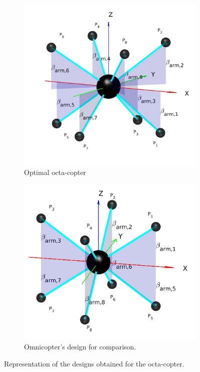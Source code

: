 \begin{figure}[!ht]
  \begin{subfigure}[b]{0.49\textwidth}
    \includegraphics[width=\linewidth]{images/Octacopter.jpg}
    \caption{Optimal octa-copter} \label{fig:Octacopter_resulta}
  \end{subfigure}
  \hspace*{\fill} %
  \begin{subfigure}[b]{0.49\textwidth}
    \includegraphics[width=\linewidth]{images/omnicopter.jpg}
    \caption{Omnicopter's design for comparison.} \label{fig:Octacopter_resultb}
  \end{subfigure}
  \caption{Representation of the designs obtained for the octa-copter.}
  \label{fig:Octacopter_result}
\end{figure}

